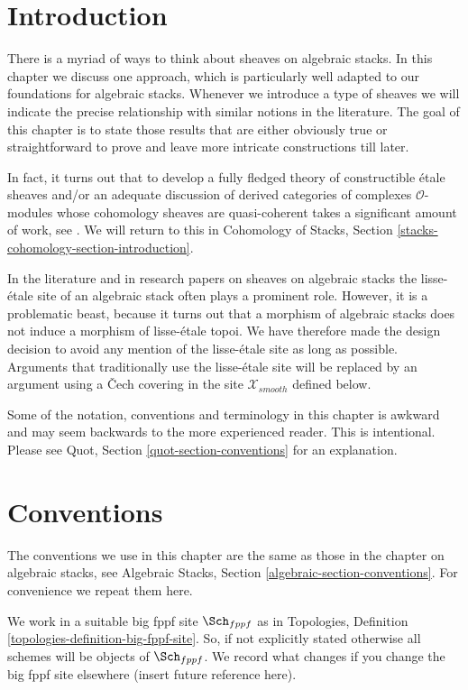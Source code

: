 \section{Introduction}
\label{stacks-sheaves-section-introduction}
There is a myriad of ways to think about sheaves on algebraic stacks.
In this chapter we discuss one approach, which is particularly well
adapted to our foundations for algebraic stacks. Whenever we introduce
a type of sheaves we will indicate the precise relationship with
similar notions in the literature.
The goal of this chapter is to state those results
that are either obviously true or straightforward to prove
and leave more intricate constructions till later.

\medskip\noindent
In fact, it turns out that to develop a fully fledged theory of
constructible \'etale sheaves and/or an adequate discussion of
derived categories of complexes $\mathcal{O}$-modules whose
cohomology sheaves are quasi-coherent takes a significant amount of work, see
\cite{olsson_sheaves}. We will return to this in
Cohomology of Stacks, Section \ref{stacks-cohomology-section-introduction}.

\medskip\noindent
In the literature and in research papers on sheaves on algebraic stacks
the lisse-\'etale site of an algebraic stack often plays a prominent role.
However, it is a problematic beast, because it turns out that a morphism of
algebraic stacks does not induce a morphism of lisse-\'etale topoi. We have
therefore made the design decision to avoid any mention of the lisse-\'etale
site as long as possible. Arguments that traditionally use the lisse-\'etale
site will be replaced by an argument using a {\v C}ech covering
in the site $\mathcal{X}_{smooth}$ defined below.

\medskip\noindent
Some of the notation, conventions and terminology in this chapter is awkward
and may seem backwards to the more experienced reader. This is intentional.
Please see Quot, Section \ref{quot-section-conventions} for an
explanation.

\section{Conventions}
\label{stacks-sheaves-section-conventions}
The conventions we use in this chapter are the same as those in the
chapter on algebraic stacks, see
Algebraic Stacks, Section \ref{algebraic-section-conventions}.
For convenience we repeat them here.

\medskip\noindent
We work in a suitable big fppf site $\Sch_{fppf}$ as in
Topologies, Definition \ref{topologies-definition-big-fppf-site}.
So, if not explicitly stated otherwise all schemes will be objects
of $\Sch_{fppf}$. We record what changes if you change the big
fppf site elsewhere (insert future reference here).

